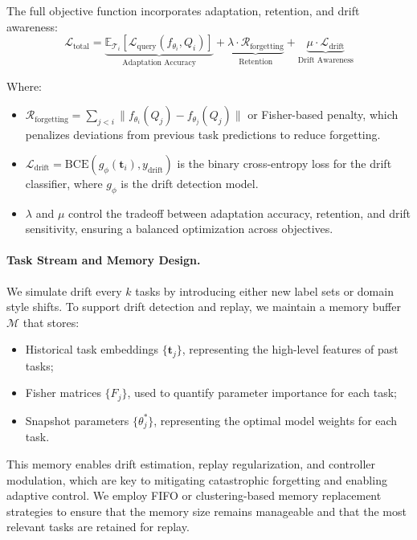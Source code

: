 \documentclass[conference]{IEEEtran}
\begin{document}
The full objective function incorporates adaptation, retention, and drift awareness:
\[
\mathcal{L}_{\text{total}} = 
\underbrace{\mathbb{E}_{\mathcal{T}_i}[\mathcal{L}_{\text{query}}(f_{\theta_i}, Q_i)]}_{\text{Adaptation Accuracy}} 
+ \underbrace{\lambda \cdot \mathcal{R}_{\text{forgetting}}}_{\text{Retention}} 
+ \underbrace{\mu \cdot \mathcal{L}_{\text{drift}}}_{\text{Drift Awareness}}
\]

Where:
\begin{itemize}
    \item $\mathcal{R}_{\text{forgetting}} = \sum_{j < i} \| f_{\theta_i}(Q_j) - f_{\theta_j}(Q_j) \|$ or Fisher-based penalty, which penalizes deviations from previous task predictions to reduce forgetting.
    \item $\mathcal{L}_{\text{drift}} = \mathrm{BCE}(g_\phi(\mathbf{t}_i), y_{\text{drift}})$ is the binary cross-entropy loss for the drift classifier, where $g_\phi$ is the drift detection model.
    \item $\lambda$ and $\mu$ control the tradeoff between adaptation accuracy, retention, and drift sensitivity, ensuring a balanced optimization across objectives.
\end{itemize}

\paragraph{Task Stream and Memory Design.}
We simulate drift every $k$ tasks by introducing either new label sets or domain style shifts. To support drift detection and replay, we maintain a memory buffer $\mathcal{M}$ that stores:
\begin{itemize}
    \item Historical task embeddings $\{\mathbf{t}_j\}$, representing the high-level features of past tasks;
    \item Fisher matrices $\{F_j\}$, used to quantify parameter importance for each task;
    \item Snapshot parameters $\{\theta_j^*\}$, representing the optimal model weights for each task.
\end{itemize}

This memory enables drift estimation, replay regularization, and controller modulation, which are key to mitigating catastrophic forgetting and enabling adaptive control. We employ FIFO or clustering-based memory replacement strategies to ensure that the memory size remains manageable and that the most relevant tasks are retained for replay.
\end{document}
